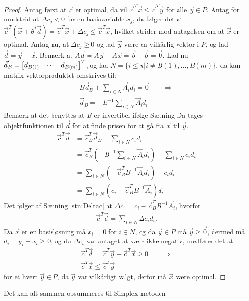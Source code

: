 \begin{proof}
Antag først at $\vec{x}$ er optimal, da vil $\vec{c}^T\vec{x} \leq \vec{c}^T\vec{y}$ for alle $\vec{y} \in P$. 
Antag for modstrid at $\Delta c_j < 0$ for en basisvariable $x_j$, da følger det at $\vec{c}^T(\vec{x}+\theta^*\vec{d}) = \vec{c}^T\vec{x} + \Delta c_j \leq \vec{c}^T\vec{x}$, hvilket strider mod antagelsen om at $\vec{x}$ er optimal.
Antag nu, at $\Delta c_j \geq 0$ og lad $\vec{y}$ være en vilkårlig vektor i $P$, og lad $\vec{d}=\vec{y}-\vec{x}$.
Bemærk at $A\vec{d} = A\vec{y}- A\vec{x} =  \vec{b} - \vec{b} =\vec{0}$.
Lad nu $\vec{d}_B = \begin{bmatrix} d_{B(1)} & \cdots & d_{B(m)} \end{bmatrix}^T$, og lad $N= \{i \leq n| i \neq B(1),...,B(m)\}$, da kan matrix-vektorproduktet omskrives til:
\begin{align*}
	B\vec{d}_B + \sum_{i \in N} \vec{A}_i d_i = \vec{0} \qquad \Rightarrow
	\\ \vec{d}_B = - B^{-1}\sum_{i \in N} \vec{A}_i d_i
\end{align*}
Bemærk at det benyttes at $B$ er invertibel ifølge Sætning %
Da tages objektfunktionen til $\vec{d}$ for at finde prisen for at gå fra $\vec{x}$ til $\vec{y}$.
\begin{align*}
 \vec{c}^T\vec{d} &= \vec{c}_B^T\vec{d}_B + \sum_{i \in N} c_i d_i 
 \\&= \vec{c}_B^T(- B^{-1}\sum_{i \in N} \vec{A}_i d_i) + \sum_{i \in N} c_i d_i  
 \\&= \sum_{i \in N} (- \vec{c}_B^T B^{-1} \vec{A}_i d_i) +  c_i d_i 
 \\&= \sum_{i \in N} ( c_i - \vec{c}_B^TB^{-1}\vec{A}_i ) d_i
\end{align*}
Det følger af Sætning \ref{stn:Deltac} at $\Delta c_i = c_i - \vec{c}_B^TB^{-1}\vec{A}_i $, hvorfor
\begin{align*}
\vec{c}^T\vec{d} = \sum_{i \in N} \Delta c_i d_i.
\end{align*}
Da $\vec{x}$ er en basisløsning må $x_i = 0$ for $i \in N$, og da $\vec{y} \in P$ må $\vec{y} \geq \vec{0}$, dermed må $d_i = y_i - x_i \geq 0$, og da $\Delta c_i$ var antaget at være ikke negativ, medfører det at
\begin{align*}
\vec{c}^T\vec{d} = \vec{c}^T\vec{y}-\vec{c}^T\vec{x} \geq 0 \qquad \Rightarrow
\\ \vec{c}^T\vec{x} \leq \vec{c}^T\vec{y}
\end{align*}
for et hvert $\vec{y} \in P$, da $\vec{y}$ var vilkårligt valgt, derfor må $\vec{x}$ være optimal.
\end{proof}
Det kan alt sammen opsummeres til Simplex metoden
